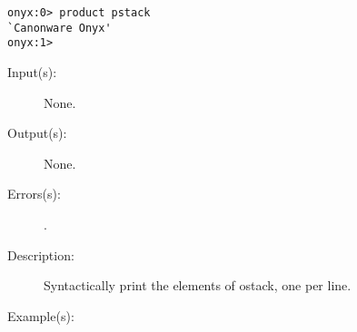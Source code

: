 \begin{description}
\begin{description}
\begin{verbatim}
onyx:0> product pstack
`Canonware Onyx'
onyx:1>
		\end{verbatim}
	\end{description}
\label{systemdict:pstack}
\item[{\onyxop{--}{pstack}{--}}: ]
	\begin{description}\item[]
	\item[Input(s): ] None.
	\item[Output(s): ] None.
	\item[Errors(s): ]
		\begin{description}\item[]
		\item[.]
		\end{description}
	\item[Description: ]
		Syntactically print the elements of ostack, one per line.
	\item[Example(s): ]\begin{verbatim}


\end{verbatim}
\end{description}
\end{description}
